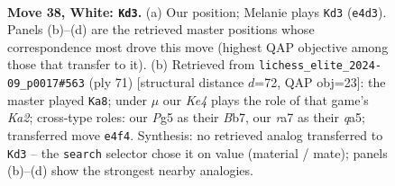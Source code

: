 \documentclass[11pt]{article}
\begin{document}
\clearpage

\begin{figure}[p]\centering
\begin{subfigure}{0.46\textwidth}\centering
\resizebox{\linewidth}{!}{%
\newchessgame
\chessboard[
  setfen={7r/r3k3/1pp1p1pp/3q2P1/Pp1PK3/4P3/R4Q2/2B5 w - - 2 38},
  showmover=false,
  pgfstyle=straightmove, color=movearrow, markmove={e4-d3}
]}
\caption{}
\end{subfigure}\hfill
\begin{subfigure}{0.46\textwidth}\centering
\resizebox{\linewidth}{!}{%
\newchessgame
\chessboard[
  setfen={2r5/kb6/p3p3/Q4p2/1P2P3/5P2/1qp2BPP/3R2K1 b - - 0 36},
  showmover=false,
  pgfstyle=straightmove, color=movearrow, markmove={a7-a8}
]}
\caption{}
\end{subfigure}
\\[4pt]

\caption{\textbf{Move 38, White: \texttt{Kd3}.} (a) Our position; Melanie plays \texttt{Kd3} (\texttt{e4d3}). Panels (b)--(d) are the retrieved master positions whose correspondence most drove this move (highest QAP objective among those that transfer to it). (b) Retrieved from \texttt{lichess\_elite\_2024-09\_p0017\#563} (ply 71) [structural distance $d$=72, QAP obj=23]: the master played \texttt{Ka8}; under $\mu$ our \emph{Ke4} plays the role of that game's \emph{Ka2}; cross-type roles: our \emph{P}g5 as their \emph{B}b7, our \emph{r}a7 as their \emph{q}a5; transferred move \texttt{e4f4}. Synthesis: no retrieved analog transferred to \texttt{Kd3} -- the \texttt{search} selector chose it on value (material / mate); panels (b)--(d) show the strongest nearby analogies.}
\label{fig:thought-m74}
\end{figure}

\clearpage
\end{document}
